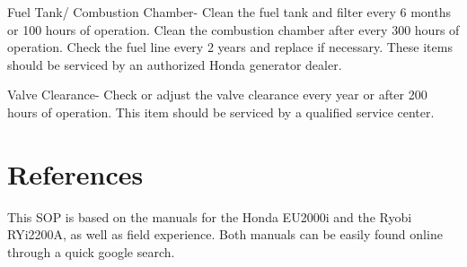 \documentclass[12pt]{../SOP3_beta}
\begin{document}
\NP Fuel Tank/ Combustion Chamber- Clean the fuel tank and filter every 6 months or 100 hours of operation. Clean the combustion chamber after every 300 hours of operation. Check the fuel line every 2 years and replace if necessary. These items should be serviced by an authorized Honda generator dealer.

\NP Valve Clearance- Check or adjust the valve clearance every year or after 200 hours of operation. This item should be serviced by a qualified service center.


\section{References}

\NP This SOP is based on the manuals for the Honda EU2000i and the Ryobi RYi2200A, as well as field experience. Both manuals can be easily found online through a quick google search.  
\end{document}
